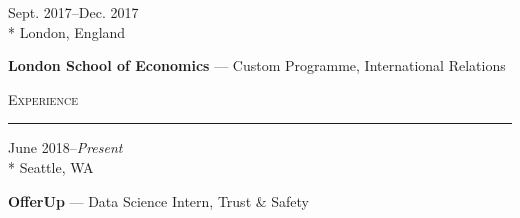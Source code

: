 \documentclass[a4paper,9pt]{article}
\begin{document}
\vspace{-3ex}
\begin{minipage}[t]{0.20\linewidth}
	\begin{small}
		\begin{spacing}{1.10}
			\begin{flushright}
				Sept. 2017--Dec. 2017
				\\*
				\vspace*{2.5pt}
				London, England
			\end{flushright}
		\end{spacing}
	\end{small}
\end{minipage}
\hspace{4mm}
\begin{minipage}[t]{0.75\linewidth}
	\begin{small}
		\begin{spacing}{1.10}
			\begin{flushleft}
				\textbf{London School of Economics} --- Custom Programme, International Relations
			\end{flushleft}
		\end{spacing}
	\end{small}
\end{minipage}

\vspace{-5ex}
\vspace*{25pt}

\begin{Large}
	\textsc{Experience}
\end{Large}
\vspace*{5pt}
\hrule
\vspace*{5pt}

\vspace{1ex}	
\begin{minipage}[t]{0.20\linewidth}
	\begin{small}
		\begin{spacing}{1.00}
			\begin{flushright}
				June 2018--\textit{Present}
				\\*
				\vspace*{2.5pt}
				Seattle, WA
			\end{flushright}
		\end{spacing}
	\end{small}
\end{minipage}
\hspace{4mm}
\begin{minipage}[t]{0.75\linewidth}
	\begin{small}
		\begin{spacing}{1.00}
			\begin{flushleft}
				\textbf{OfferUp} --- Data Science Intern, Trust \& Safety
			\end{flushleft}
		\end{spacing}
	\end{small}
\end{minipage}
\end{document}
